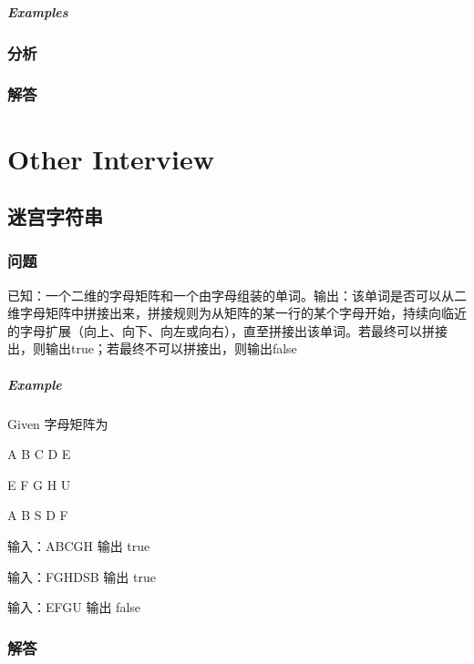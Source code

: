 \documentclass[UTF8,a4paper,12pt]{ctexbook}
\begin{document}
		\subparagraph{Examples}
		
		\subsubsection{分析}
		
		\subsubsection{解答}

\section{Other Interview}
\subsection{迷宫字符串} 
	\subsubsection{问题}
	已知：一个二维的字母矩阵和一个由字母组装的单词。输出：该单词是否可以从二维字母矩阵中拼接出来，拼接规则为从矩阵的某一行的某个字母开始，持续向临近的字母扩展（向上、向下、向左或向右），直至拼接出该单词。若最终可以拼接出，则输出true；若最终不可以拼接出，则输出false
	
	\subparagraph{Example}
		Given 字母矩阵为
		
			A B C D E
			
			E F G H U
			
			A B S D F
		
		输入：ABCGH  输出 true
		
		输入：FGHDSB  输出 true
		
		输入：EFGU  输出 false
	\subsubsection{解答}
\end{document}
